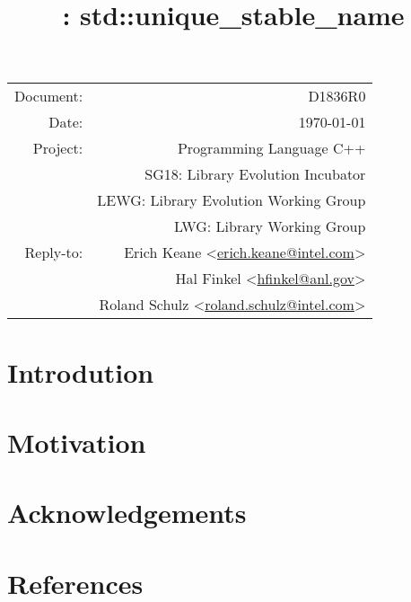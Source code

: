 \documentclass{article}
\title{\papernum: std::unique\_stable\_name}
\date{}
\author{}
\makeatletter
\newcommand{\erichemail}{erich.keane@intel.com}
\newcommand{\halemail}{hfinkel@anl.gov}
\newcommand{\rolandemail}{roland.schulz@intel.com}
\newcommand{\email}[1]{\href{mailto:#1}{#1}}
\newcommand{\papernum}{D1836R0}
\makeatother
\begin{document}
\begin{flushright}
  \begin{tabular}{rr}
  Document:   &\papernum\\
  Date:       &\today\\
  Project:    &Programming Language C++\\
              &SG18: Library Evolution Incubator\\
              &LEWG: Library Evolution Working Group\\
              &LWG:  Library Working Group\\
  Reply-to:   &Erich Keane \textless\email{\erichemail}\textgreater\\
              &Hal Finkel \textless\email{\halemail}\textgreater\\
              &Roland Schulz \textless\email{\rolandemail}\textgreater\\
  \end{tabular}
\end{flushright}

{\let\newpage\relax\maketitle} 
\maketitle\vspace{-1cm}

\section{Introdution}
\section{Motivation}
\section{Acknowledgements}
\section{References}
\end{document}
